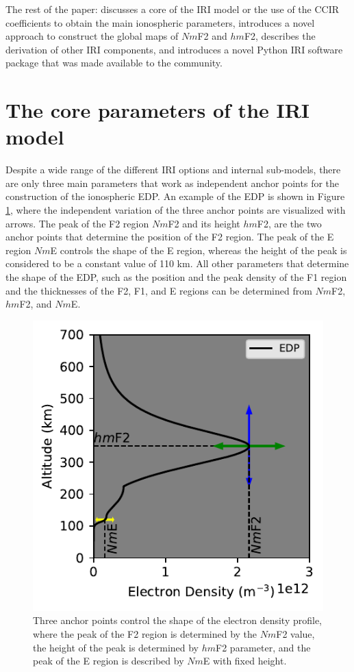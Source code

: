 \documentclass[draft]{agujournal2019}
\begin{document}
The rest of the paper: discusses a core of the IRI model or the use of the CCIR coefficients to obtain the main ionospheric parameters, introduces a novel approach to construct the global maps of $Nm$F2 and $hm$F2, describes the derivation of other IRI components, and introduces a novel Python IRI software package that was made available to the community. 
\section{The core parameters of the IRI model}\label{Core}

Despite a wide range of the different IRI options and internal sub-models, there are only three main parameters that work as independent anchor points for the construction of the ionospheric EDP. An example of the EDP is shown in Figure \ref{fig:EDP}, where the independent variation of the three anchor points are visualized with arrows. The peak of the F2 region $Nm$F2 and its height $hm$F2, are the two anchor points that determine the position of the F2 region. The peak of the E region $Nm$E controls the shape of the E region, whereas the height of the peak is considered to be a constant value of 110 km. All other parameters that determine the shape of the EDP, such as the position and the peak density of the F1 region and the thicknesses of the F2, F1, and E regions can be determined from $Nm$F2, $hm$F2, and $Nm$E. 

\begin{figure}[H]
  \includegraphics[scale=0.9]{PyIRI_EDP_components.pdf}
  \caption{Three anchor points control the shape of the electron density profile, where the peak of the F2 region is determined by the $Nm$F2 value, the height of the peak is determined by $hm$F2 parameter, and the peak of the E region is described by $Nm$E with fixed height.}
  \label{fig:EDP}
\end{figure}
\end{document}
